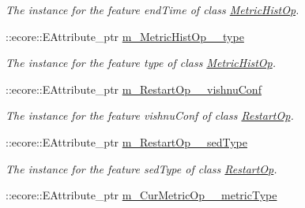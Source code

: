 \begin{DoxyCompactItemize}
\begin{DoxyCompactList}\small\item\em The instance for the feature endTime of class \hyperlink{classIMS__Data_1_1MetricHistOp}{MetricHistOp}. \item\end{DoxyCompactList}\item 
\hypertarget{classIMS__Data_1_1IMS__DataPackage_aad1217dad8ffb8d86fbe1658831c18c0}{
::ecore::EAttribute\_\-ptr \hyperlink{classIMS__Data_1_1IMS__DataPackage_aad1217dad8ffb8d86fbe1658831c18c0}{m\_\-MetricHistOp\_\-\_\-type}}
\label{classIMS__Data_1_1IMS__DataPackage_aad1217dad8ffb8d86fbe1658831c18c0}

\begin{DoxyCompactList}\small\item\em The instance for the feature type of class \hyperlink{classIMS__Data_1_1MetricHistOp}{MetricHistOp}. \item\end{DoxyCompactList}\item 
\hypertarget{classIMS__Data_1_1IMS__DataPackage_aab113945131a442caf3f37eafe9beca5}{
::ecore::EAttribute\_\-ptr \hyperlink{classIMS__Data_1_1IMS__DataPackage_aab113945131a442caf3f37eafe9beca5}{m\_\-RestartOp\_\-\_\-vishnuConf}}
\label{classIMS__Data_1_1IMS__DataPackage_aab113945131a442caf3f37eafe9beca5}

\begin{DoxyCompactList}\small\item\em The instance for the feature vishnuConf of class \hyperlink{classIMS__Data_1_1RestartOp}{RestartOp}. \item\end{DoxyCompactList}\item 
\hypertarget{classIMS__Data_1_1IMS__DataPackage_a4795eba00d745029b468c03b5d0a5248}{
::ecore::EAttribute\_\-ptr \hyperlink{classIMS__Data_1_1IMS__DataPackage_a4795eba00d745029b468c03b5d0a5248}{m\_\-RestartOp\_\-\_\-sedType}}
\label{classIMS__Data_1_1IMS__DataPackage_a4795eba00d745029b468c03b5d0a5248}

\begin{DoxyCompactList}\small\item\em The instance for the feature sedType of class \hyperlink{classIMS__Data_1_1RestartOp}{RestartOp}. \item\end{DoxyCompactList}\item 
\hypertarget{classIMS__Data_1_1IMS__DataPackage_a66961d4a0140cef7d26304e2dfb910d4}{
::ecore::EAttribute\_\-ptr \hyperlink{classIMS__Data_1_1IMS__DataPackage_a66961d4a0140cef7d26304e2dfb910d4}{m\_\-CurMetricOp\_\-\_\-metricType}}
\label{classIMS__Data_1_1IMS__DataPackage_a66961d4a0140cef7d26304e2dfb910d4}


\end{DoxyCompactItemize}
